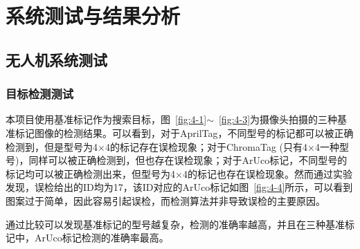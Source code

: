 
\chapter{系统测试与结果分析}
\section{无人机系统测试}
\subsection{目标检测测试}
本项目使用基准标记作为搜索目标，图~\ref{fig:4-1}$\sim$~\ref{fig:4-3}为摄像头拍摄的三种基准标记图像的检测结果。可以看到，对于AprilTag，不同型号的标记都可以被正确检测到，但是型号为4×4的标记存在误检现象；对于ChromaTag (只有4×4一种型号)，同样可以被正确检测到，但也存在误检现象；对于ArUco标记，不同型号的标记均可以被正确检测出来，但型号为4×4的标记也存在误检现象。然而通过实验发现，误检给出的ID均为17，该ID对应的ArUco标记如图~\ref{fig:4-4}所示，可以看到图案过于简单，因此容易引起误检，而检测算法并非导致误检的主要原因。

通过比较可以发现基准标记的型号越复杂，检测的准确率越高，并且在三种基准标记中，ArUco标记检测的准确率最高。

